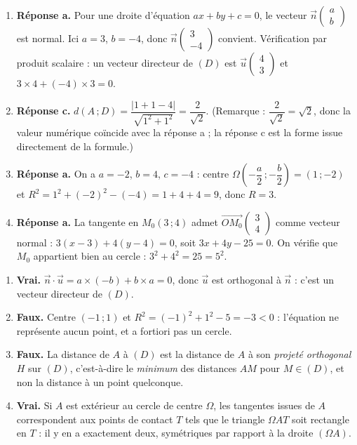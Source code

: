 \documentclass[11pt]{article}
\begin{document}
\begin{corrige}
\begin{enumerate}
\item \textbf{Réponse a.} Pour une droite d'équation $ax+by+c=0$, le vecteur $\vec{n}\begin{pmatrix} a \\ b \end{pmatrix}$ est normal. Ici $a=3$, $b=-4$, donc $\vec{n}\begin{pmatrix} 3 \\ -4 \end{pmatrix}$ convient. Vérification par produit scalaire : un vecteur directeur de $(D)$ est $\vec{u}\begin{pmatrix} 4 \\ 3 \end{pmatrix}$ et $3\times 4 + (-4)\times 3 = 0$.
\item \textbf{Réponse c.} $d(A\,;D)=\dfrac{|1+1-4|}{\sqrt{1^2+1^2}}=\dfrac{2}{\sqrt{2}}$. (Remarque : $\dfrac{2}{\sqrt{2}}=\sqrt{2}$, donc la valeur numérique coïncide avec la réponse a ; la réponse c est la forme issue directement de la formule.)
\item \textbf{Réponse a.} On a $a=-2$, $b=4$, $c=-4$ : centre $\Omega\left(-\dfrac{a}{2}\,;-\dfrac{b}{2}\right)=(1\,;-2)$ et $R^2=1^2+(-2)^2-(-4)=1+4+4=9$, donc $R=3$.
\item \textbf{Réponse a.} La tangente en $M_0(3\,;4)$ admet $\overrightarrow{OM_0}\begin{pmatrix} 3 \\ 4 \end{pmatrix}$ comme vecteur normal : $3(x-3)+4(y-4)=0$, soit $3x+4y-25=0$. On vérifie que $M_0$ appartient bien au cercle : $3^2+4^2=25=5^2$.
\end{enumerate}
\end{corrige}

\begin{corrige}
\begin{enumerate}
\item \textbf{Vrai.} $\vec{n}\cdot\vec{u}=a\times(-b)+b\times a=0$, donc $\vec{u}$ est orthogonal à $\vec{n}$ : c'est un vecteur directeur de $(D)$.
\item \textbf{Faux.} Centre $(-1\,;1)$ et $R^2=(-1)^2+1^2-5=-3<0$ : l'équation ne représente aucun point, et a fortiori pas un cercle.
\item \textbf{Faux.} La distance de $A$ à $(D)$ est la distance de $A$ à son \emph{projeté orthogonal} $H$ sur $(D)$, c'est-à-dire le \emph{minimum} des distances $AM$ pour $M\in(D)$, et non la distance à un point quelconque.
\item \textbf{Vrai.} Si $A$ est extérieur au cercle de centre $\Omega$, les tangentes issues de $A$ correspondent aux points de contact $T$ tels que le triangle $\Omega AT$ soit rectangle en $T$ : il y en a exactement deux, symétriques par rapport à la droite $(\Omega A)$.
\end{enumerate}
\end{corrige}
\end{document}
